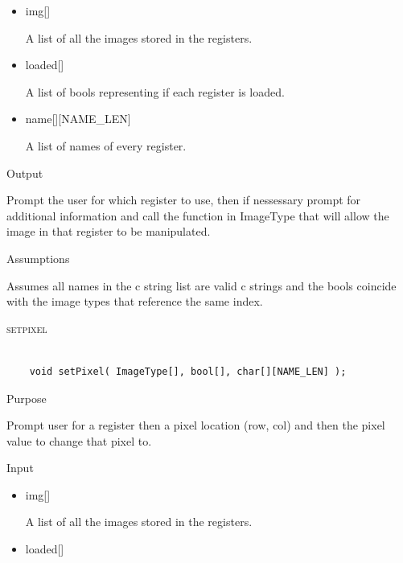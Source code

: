 \documentclass[pdftex, 11pt]{article}
\begin{document}
\begin{description}
\begin{description}
\begin{itemize}
					\item{img[]}

						A list of all the images stored in the registers.

					\item{loaded[]}

						A list of bools representing if each register is loaded.

					\item{name[][NAME\_LEN]}

						A list of names of every register.

				\end{itemize}

			\item{Output}

				Prompt the user for which register to use, then if nessessary
				prompt for additional information and call the function
				in ImageType that will allow the image in that register to
				be manipulated.

			\item{Assumptions}

				Assumes all names in the c string list are valid c
				strings and the bools coincide with the image types that
				reference the same index.

		\end{description}



	\item{\textsc{setpixel}}

		\begin{lstlisting}

	void setPixel( ImageType[], bool[], char[][NAME_LEN] );
		\end{lstlisting}

		\begin{description}
			\item{Purpose}

				Prompt user for a register then a pixel location (row, col) and then the pixel
				value to change that pixel to.

			\item{Input}

				\begin{itemize}

					\item{img[]}

						A list of all the images stored in the registers.

					\item{loaded[]}


\end{itemize}
\end{description}
\end{description}
\end{document}
